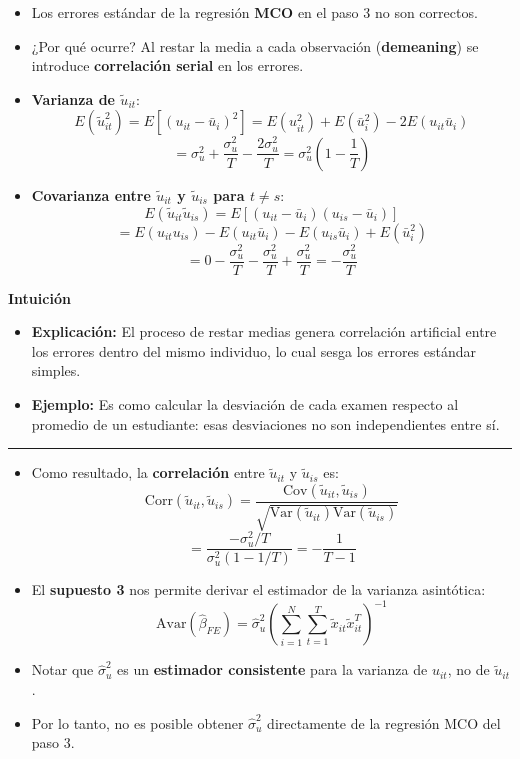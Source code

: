 \documentclass[12pt]{article}
\begin{document}
\begin{itemize}
    \item Los errores estándar de la regresión \textbf{MCO} en el paso 3 no son correctos.  
    \item ¿Por qué ocurre? Al restar la media a cada observación (\textbf{demeaning}) se introduce \textbf{correlación serial} en los errores.
    
    \item \textbf{Varianza de $\tilde{u}_{it}$}:  
    \[
    E(\tilde{u}_{it}^2) = E[(u_{it} - \bar{u}_i)^2] 
    = E(u_{it}^2) + E(\bar{u}_i^2) - 2E(u_{it}\bar{u}_i)
    \]
    \[
    = \sigma_u^2 + \frac{\sigma_u^2}{T} - \frac{2\sigma_u^2}{T} 
    = \sigma_u^2 \left(1 - \frac{1}{T}\right)
    \]
    
    \item \textbf{Covarianza entre $\tilde{u}_{it}$ y $\tilde{u}_{is}$ para $t \neq s$}:  
    \[
    E(\tilde{u}_{it}\tilde{u}_{is}) = E[(u_{it} - \bar{u}_i)(u_{is} - \bar{u}_i)]
    \]
    \[
    = E(u_{it}u_{is}) - E(u_{it}\bar{u}_i) - E(u_{is}\bar{u}_i) + E(\bar{u}_i^2)
    \]
    \[
    = 0 - \frac{\sigma_u^2}{T} - \frac{\sigma_u^2}{T} + \frac{\sigma_u^2}{T} 
    = -\frac{\sigma_u^2}{T}
    \]
\end{itemize}

\noindent\textbf{Intuición}
\begin{itemize}
    \item \textbf{Explicación:} El proceso de restar medias genera correlación artificial entre los errores dentro del mismo individuo, lo cual sesga los errores estándar simples.
    \item \textbf{Ejemplo:} Es como calcular la desviación de cada examen respecto al promedio de un estudiante: esas desviaciones no son independientes entre sí.
\end{itemize}

\hrule

\begin{itemize}
    \item Como resultado, la \textbf{correlación} entre $\tilde{u}_{it}$ y $\tilde{u}_{is}$ es:
    \[
    \text{Corr}(\tilde{u}_{it}, \tilde{u}_{is}) 
    = \frac{\text{Cov}(\tilde{u}_{it}, \tilde{u}_{is})}{\sqrt{\text{Var}(\tilde{u}_{it})\text{Var}(\tilde{u}_{is})}}
    \]
    \[
    = \frac{-\sigma_u^2 / T}{\sigma_u^2 (1 - 1/T)} 
    = -\frac{1}{T-1}
    \]
    
    \item El \textbf{supuesto 3} nos permite derivar el estimador de la varianza asintótica:
    \[
    \text{Avar}(\hat{\beta}_{FE}) 
    = \hat{\sigma}_u^2 \left( \sum_{i=1}^N \sum_{t=1}^T \tilde{x}_{it}\tilde{x}_{it}^T \right)^{-1}
    \]
    
    \item Notar que $\hat{\sigma}_u^2$ es un \textbf{estimador consistente} para la varianza de $u_{it}$, no de $\tilde{u}_{it}$.
    
    \item Por lo tanto, no es posible obtener $\hat{\sigma}_u^2$ directamente de la regresión MCO del paso 3.
\end{itemize}
\end{document}

